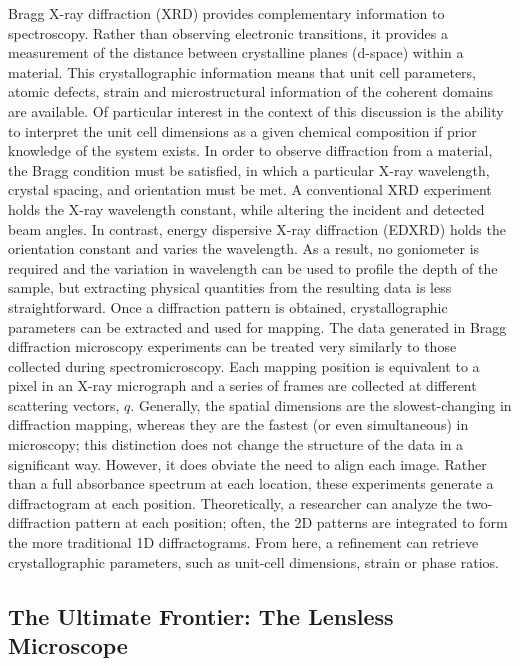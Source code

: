 \documentclass[journal=cmatex,manuscript=perspective]{achemso}
\begin{document}
Bragg X-ray diffraction (XRD) provides complementary information to
spectroscopy. Rather than observing electronic transitions, it
provides a measurement of the distance between crystalline planes
(d-space) within a material. This crystallographic information means
that unit cell parameters, atomic defects, strain and microstructural
information of the coherent domains are available. Of particular
interest in the context of this discussion is the ability to interpret
the unit cell dimensions as a given chemical composition if prior
knowledge of the system exists. In order to observe diffraction from a
material, the Bragg condition must be satisfied, in which a particular
X-ray wavelength, crystal spacing, and orientation must be met. A
conventional XRD experiment holds the X-ray wavelength constant, while
altering the incident and detected beam angles. In contrast, energy
dispersive X-ray diffraction (EDXRD) holds the orientation constant
and varies the wavelength. As a result, no goniometer is required and
the variation in wavelength can be used to profile the depth of the
sample, but extracting physical quantities from the resulting data is
less straightforward\cite{michel2005,strobridge2015}. Once a
diffraction pattern is obtained, crystallographic parameters can be
extracted and used for mapping. The data generated in Bragg
diffraction microscopy experiments can be treated very similarly to
those collected during spectromicroscopy. Each mapping position is
equivalent to a pixel in an X-ray micrograph and a series of frames
are collected at different scattering vectors, $q$. Generally, the
spatial dimensions are the slowest-changing in diffraction mapping,
whereas they are the fastest (or even simultaneous) in microscopy;
this distinction does not change the structure of the data in a
significant way. However, it does obviate the need to align each
image. Rather than a full absorbance spectrum at each location, these
experiments generate a diffractogram at each position. Theoretically,
a researcher can analyze the two-diffraction pattern at each position;
often, the 2D patterns are integrated to form the more traditional 1D
diffractograms. From here, a refinement can retrieve crystallographic
parameters, such as unit-cell dimensions, strain or phase ratios.

\subsection{The Ultimate Frontier: The Lensless Microscope}
\end{document}
